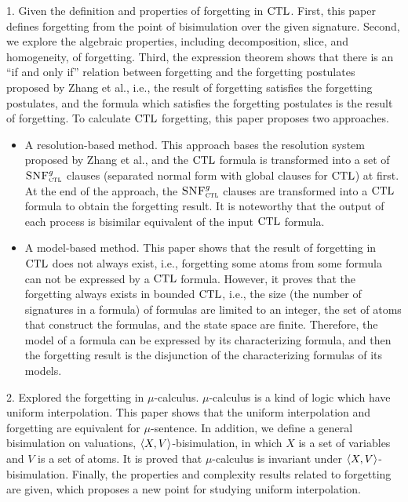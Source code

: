 \begin{englishabstract}
1. Given the definition and properties of forgetting in $\textrm{CTL}$. First, this paper defines forgetting from the point of bisimulation over the given signature. Second, we explore the algebraic properties, including decomposition, slice, and homogeneity, of forgetting. Third, the expression theorem shows that there is an ``if and only if” relation between forgetting and the forgetting postulates proposed by Zhang et al., i.e., the result of forgetting satisfies the forgetting postulates, and the formula which satisfies the forgetting postulates is the result of forgetting.
To calculate $\textrm{CTL}$ forgetting, this paper proposes two approaches.

\begin{itemize}
	\item A resolution-based method. This approach bases the resolution system proposed by Zhang et al., and the $\textrm{CTL}$ formula is transformed into a set of ${\textsc{SNF}_{\textsc{ctl}}^g}$ clauses (separated normal form with global clauses for $\textrm{CTL}$) at first. At the end of the approach, the ${\textsc{SNF}_{\textsc{ctl}}^g}$ clauses are transformed into a $\textrm{CTL}$ formula to obtain the forgetting result. It is noteworthy that the output of each process is bisimilar equivalent of the input $\textrm{CTL}$ formula.
	\item A model-based method. This paper shows that the result of forgetting in $\textrm{CTL}$ does not always exist, i.e., forgetting some atoms from some formula can not be expressed by a $\textrm{CTL}$ formula. However, it proves that the forgetting always exists in bounded $\textrm{CTL}$, i.e., the size (the number of signatures in a formula) of formulas are limited to an integer, the set of atoms that construct the formulas, and the state space are finite. Therefore, the model of a formula can be expressed by its characterizing formula, and then the forgetting result is the disjunction of the characterizing formulas of its models. 
\end{itemize}

2. Explored the forgetting in $\mu$-calculus. $\mu$-calculus is a kind of logic which have uniform interpolation. This paper shows that the uniform interpolation and forgetting  are equivalent for $\mu$-sentence.
In addition, we define a general bisimulation on valuations, ${\langle{X,V}\rangle}$-bisimulation, in which $X$ is a set of variables and $V$ is a set of atoms.  It is proved that  $\mu$-calculus is invariant under ${\langle{X,V}\rangle}$-bisimulation.
Finally, the properties and complexity results related to forgetting are given, which proposes a new point for studying uniform interpolation.


\end{englishabstract}

